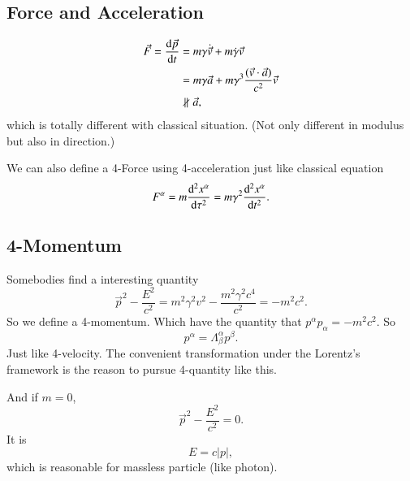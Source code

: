 \documentclass[openany,10pt]{book}
\theoremstyle{definition}
\theoremstyle{definition}
\theoremstyle{remark}
\begin{document}
\subsection{Force and Acceleration}
\begin{equation}\begin{aligned}
\vec F=\frac{{\rm d}\vec p}{{\rm d}t}&=m\gamma \dot{\vec v}+m\dot \gamma \vec v\\
&=m\gamma \vec a+m\gamma^3\frac{(\vec v\cdot \vec a) }{c^2}\vec v\\
& \nparallel \vec a,
\end{aligned}
\end{equation}
which is totally different with classical situation. (Not only different in modulus but also in direction.)

We can also define a 4-Force using 4-acceleration just like classical equation 
\begin{equation}
    F^\alpha=m\frac{{\rm d}^2x^\alpha}{{\rm d}\tau^2}=m\gamma^2\frac{{\rm d}^2x^\alpha}{{\rm d}t^2}.
\end{equation}

\subsection{4-Momentum}
Somebodies find a  interesting quantity
\begin{equation}
    \vec p^2-\frac{E^2}{c^2}=m^2\gamma^2v^2-\frac{m^2\gamma^2c^4}{c^2}=-m^2c^2.
\end{equation}
So we define a 4-momentum.
Which have the quantity that $p^\alpha p_\alpha=-m^2c^2$. 
So
\begin{equation}
    p^\alpha=\Lambda^\alpha_\beta p^\beta.
\end{equation}
Just like 4-velocity. The convenient transformation under the Lorentz's framework is the reason to pursue 4-quantity like this. 

And if $m=0$, 
\begin{equation}
    \vec p^2-\frac{E^2}{c^2}=0.
\end{equation}
It is 
\begin{equation}
    E=c|p|,
\end{equation}
which is reasonable for massless particle (like photon).
\end{document}
